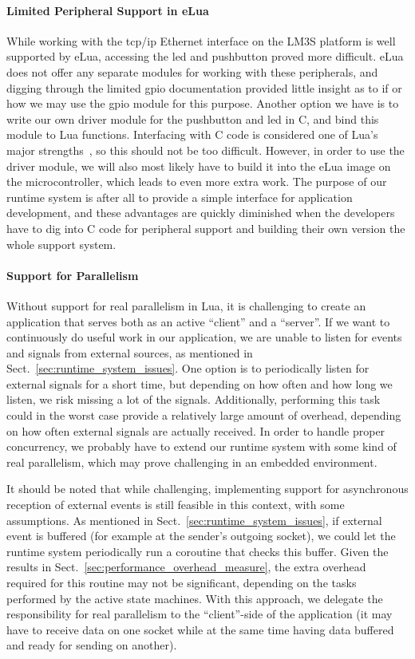 \paragraph{Limited Peripheral Support in eLua} While working with the \gls{tcp}/\gls{ip} Ethernet interface on the LM3S platform is well supported by eLua, accessing the \gls{led} and pushbutton proved more difficult. eLua does not offer any separate modules for working with these peripherals, and digging through the limited \gls{gpio} documentation provided little insight as to if or how we may use the \gls{gpio} module for this purpose. Another option we have is to write our own driver module for the pushbutton and \gls{led} in C, and bind this module to Lua functions. Interfacing with C code is considered one of Lua's major strengths~\cite{inproceedings:the_evolution_of_lua}, so this should not be too difficult. However, in order to use the driver module, we will also most likely have to build it into the eLua image on the microcontroller, which leads to even more extra work. The purpose of our runtime system is after all to provide a simple interface for application development, and these advantages are quickly diminished when the developers have to dig into C code for peripheral support and building their own version the whole support system.

\paragraph{Support for Parallelism} Without support for real parallelism in Lua, it is challenging to create an application that serves both as an active ``client'' and a ``server''. If we want to continuously do useful work in our application, we are unable to listen for events and signals from external sources, as mentioned in Sect.~\ref{sec:runtime_system_issues}. One option is to periodically listen for external signals for a short time, but depending on how often and how long we listen, we risk missing a lot of the signals. Additionally, performing this task could in the worst case provide a relatively large amount of overhead, depending on how often external signals are actually received. In order to handle proper concurrency, we probably have to extend our runtime system with some kind of real parallelism, which may prove challenging in an embedded environment.

\noindent
It should be noted that while challenging, implementing support for asynchronous reception of external events is still feasible in this context, with some assumptions. As mentioned in Sect.~\ref{sec:runtime_system_issues}, if external event is buffered (for example at the sender's outgoing socket), we could let the runtime system periodically run a coroutine that checks this buffer. Given the results in Sect.~\ref{sec:performance_overhead_measure}, the extra overhead required for this routine may not be significant, depending on the tasks performed by the active state machines. With this approach, we delegate the responsibility for real parallelism to the ``client''-side of the application (it may have to receive data on one socket while at the same time having data buffered and ready for sending on another).

